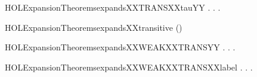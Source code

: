 \newcommand{\HOLExpansionTheoremsexpandsXXTRANSXXtau}{\UseVerbatim{HOLExpansionTheoremsexpandsXXTRANSXXtau}}
\begin{SaveVerbatim}{HOLExpansionTheoremsexpandsXXTRANSXXtauYY}
\HOLTokenTurnstile{} \HOLSymConst{\HOLTokenForall{}} .
          \HOLSymConst{\HOLTokenImp{}}
       \HOLSymConst{\HOLTokenForall{}}.  \HOLTokenTransBegin\HOLConst{\ensuremath{\tau}}\HOLTokenTransEnd {} \HOLSymConst{\HOLTokenImp{}} \HOLSymConst{\HOLTokenExists{}}.  \HOLTokenWeakTransBegin\HOLConst{\ensuremath{\tau}}\HOLTokenWeakTransEnd {} \HOLSymConst{\HOLTokenConj{}}   
\end{SaveVerbatim}
\newcommand{\HOLExpansionTheoremsexpandsXXTRANSXXtauYY}{\UseVerbatim{HOLExpansionTheoremsexpandsXXTRANSXXtauYY}}
\begin{SaveVerbatim}{HOLExpansionTheoremsexpandsXXtransitive}
\HOLTokenTurnstile{}  ()
\end{SaveVerbatim}
\newcommand{\HOLExpansionTheoremsexpandsXXtransitive}{\UseVerbatim{HOLExpansionTheoremsexpandsXXtransitive}}
\begin{SaveVerbatim}{HOLExpansionTheoremsexpandsXXWEAKXXTRANSYY}
\HOLTokenTurnstile{} \HOLSymConst{\HOLTokenForall{}} .
          \HOLSymConst{\HOLTokenImp{}}
       \HOLSymConst{\HOLTokenForall{}} .  \HOLTokenWeakTransBegin{}\HOLTokenWeakTransEnd {} \HOLSymConst{\HOLTokenImp{}} \HOLSymConst{\HOLTokenExists{}}.  \HOLTokenWeakTransBegin{}\HOLTokenWeakTransEnd {} \HOLSymConst{\HOLTokenConj{}}   
\end{SaveVerbatim}
\newcommand{\HOLExpansionTheoremsexpandsXXWEAKXXTRANSYY}{\UseVerbatim{HOLExpansionTheoremsexpandsXXWEAKXXTRANSYY}}
\begin{SaveVerbatim}{HOLExpansionTheoremsexpandsXXWEAKXXTRANSXXlabel}
\HOLTokenTurnstile{} \HOLSymConst{\HOLTokenForall{}} .
          \HOLSymConst{\HOLTokenImp{}}
       \HOLSymConst{\HOLTokenForall{}} .
            \HOLTokenWeakTransBegin{} \HOLTokenWeakTransEnd {} \HOLSymConst{\HOLTokenImp{}} \HOLSymConst{\HOLTokenExists{}}.  \HOLTokenWeakTransBegin{} \HOLTokenWeakTransEnd {} \HOLSymConst{\HOLTokenConj{}}   
\end{SaveVerbatim}
